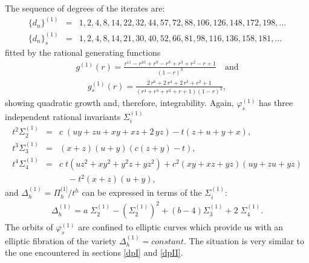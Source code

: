 \documentclass[reqno]{amsart}
\numberwithin{equation}{section}
\numberwithin{figure}{section}
\begin{document}
The sequence of degrees of the iterates are:
\begin{eqnarray*}
\{d_n\}^{(1)}& =& 1, 2, 4, 8, 14, 22, 32, 44, 57, 72, 88, 106, 126, 148, 172, 198 , \dots \\
\{d_n\}_s^{(1)} &=& 1,2,4,8,14,21,30,40,52,66,81,98,116,136, 158, 181, \dots
\end{eqnarray*}
fitted by the rational generating functions
\begin{eqnarray*}
g^{(1)}(r) = {\frac {{r}^{11}-{r}^{10}+{r}^{9}-{r}^{8}+{r}^{3}+{r}^{2}-r+1}{
 \left( 1-r \right) ^{3}}} \quad {\mbox {and}}
\end{eqnarray*}
\begin{eqnarray*}
g_s^{(1)}(r)={\frac {2\,{r}^{6}+2\,{r}^{4}+2\,{r}^{3}+{r}^{2}+1}{ \left( {r}^{4}+{
r}^{3}+{r}^{2}+r+1 \right)  \left( 1-r \right) ^{3}}},
\end{eqnarray*}
showing quadratic growth and, therefore, integrability.
Again, $\varphi_s^{(1)}$ has three independent rational invariants
$\Sigma_i^{(1)}$
\begin{eqnarray*}
t^2 \Sigma_2^{(1)}& =& c\; \left( uy+zu+xy+xz+2\,yz \right) 
-t \left( z+u+y+x \right) ,
\\
t^3 \Sigma_3^{(1)} &=& \left( x+z \right)  \left( u+y \right)  \left( c \left( z+y
 \right) -t \right) ,
\\
t^4 \Sigma_4^{(1)} &=&  
c\;t \left( u{z}^{2}+x{y}^{2}+{y}^{2}z+y{z}^{2} \right)
+ c^2\left( xy+xz+yz \right)  \left( uy+zu+yz \right)\\
&&\quad
-{t}^{2} \left( x+z \right)  \left( u+y \right) ,
\end{eqnarray*}
and $\Delta_h^{(1)}=\Pi_h^{(1]}/t^h$ can be expressed in terms of the $\Sigma_i^{(1)}$:
\begin{eqnarray}
\Delta_h^{(1)} = a \;\Sigma_2^{(1)} - (\Sigma_2^{(1)})^2 +(b-4) \Sigma_3^{(1)} 
+2 \;\Sigma_4^{(1)}.
\end{eqnarray}
The orbits of  $\varphi_s^{(1)}$ are confined to elliptic curves which
provide us with an elliptic fibration of the variety $\Delta_h^{(1)} =
constant$. The situation is very similar to the one encountered in
sections \ref{dpI} and \ref{dpII}.
\end{document}
